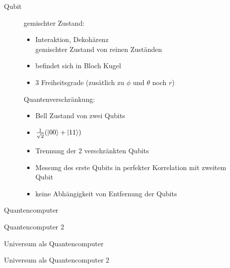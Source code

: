 \documentclass[aspectratio=1610, 9pt]{beamer}
\begin{document}
\begin{frame}{Qubit}
  \begin{figure}
    \begin{minipage}{0.49\textwidth}
      gemischter Zustand:
      \begin{itemize}
        \item Interaktion, Dekohärenz \rightarrow \\
        gemischter Zustand von reinen Zuständen
        \item befindet sich in Bloch Kugel
        \item 3 Freiheitsgrade (zusätlich zu $\phi$ und $\theta$ noch $r$)
      \end{itemize}
    \end{minipage}
    \hfill
    \begin{minipage}{0.49\textwidth}
      Quantenverschränkung:
      \begin{itemize}
        \item Bell Zustand von zwei Qubits
        \item[] $\frac{1}{\sqrt{2}}(\ket{00} + \ket{11})$
        \item Trennung der 2 verschränkten Qubits
        \item Messung des erste Qubits in perfekter Korrelation mit zweitem Qubit
        \item keine Abhängigkeit von Entfernung der Qubits
      \end{itemize}

    \end{minipage}
  \end{figure}
\end{frame}

\begin{frame}{Quantencomputer}

\end{frame}

\begin{frame}{Quantencomputer 2}

\end{frame}

\begin{frame}{Universum als Quantencomputer}

\end{frame}

\begin{frame}{Universum als Quantencomputer 2}

\end{frame}
\end{document}
